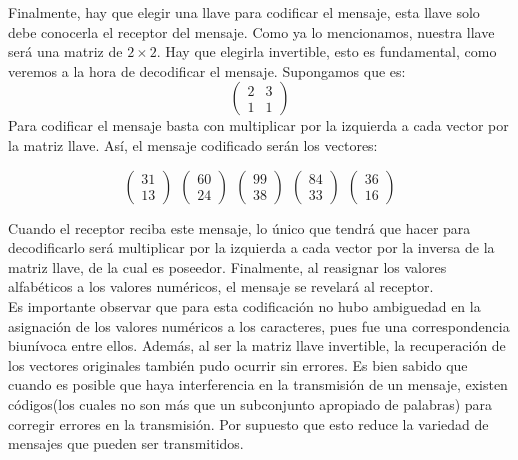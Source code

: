\documentclass[12pt,a4paper]{article}
\begin{document}
Finalmente, hay que elegir una llave para codificar el mensaje, esta llave solo debe conocerla el receptor del mensaje. Como ya lo mencionamos, nuestra llave ser\'a una matriz de $2\times 2$. Hay que elegirla invertible, esto es fundamental, como veremos a la hora de decodificar el mensaje. Supongamos que es:
$$\left(\begin{array}{cc}2&3\\1&1\end{array}\right)$$
\newpage
Para codificar el mensaje basta con multiplicar por la izquierda a cada vector por la matriz llave. As\'i, el mensaje codificado ser\'an los vectores:

$$\left(\begin{array}{c}31\\13\end{array}\right)~~\left(\begin{array}{c}60\\24\end{array}\right)~~\left(\begin{array}{c}99\\38\end{array}\right)~~\left(\begin{array}{c}84\\33\end{array}\right)~~\left(\begin{array}{c}36\\16\end{array}\right)$$ 


Cuando el receptor reciba este mensaje, lo \'unico que tendr\'a que hacer para decodificarlo ser\'a multiplicar por la izquierda a cada vector por la inversa de la matriz llave, de la cual es poseedor. Finalmente, al reasignar los valores alfab\'eticos a los valores num\'ericos, el mensaje se revelar\'a al receptor.\\

Es importante observar que para esta codificaci\'on no hubo ambiguedad en la asignaci\'on de los valores num\'ericos a los caracteres, pues fue una correspondencia biun\'ivoca entre ellos. Adem\'as, al ser la matriz llave invertible, la recuperaci\'on de los vectores originales tambi\'en pudo ocurrir sin errores. Es bien sabido que cuando es posible que haya interferencia en la transmisi\'on de un mensaje, existen c\'odigos(los cuales no son m\'as que un subconjunto apropiado de palabras) para corregir errores en la transmisi\'on. Por supuesto que esto reduce la variedad de mensajes que pueden ser transmitidos.\\
\end{document}
